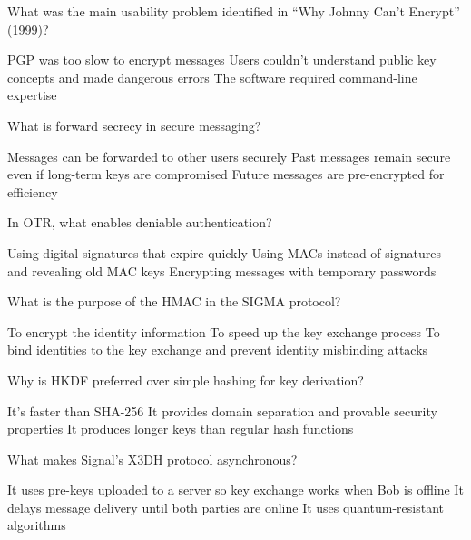\documentclass[10pt,a4paper,american]{exam}
\begin{document}
\begin{questions}
	\question What was the main usability problem identified in ``Why Johnny Can't Encrypt'' (1999)?
	\begin{randomizechoices}
		\choice PGP was too slow to encrypt messages
		\CorrectChoice Users couldn't understand public key concepts and made dangerous errors
		\choice The software required command-line expertise
	\end{randomizechoices}

	\question What is forward secrecy in secure messaging?
	\begin{randomizechoices}
		\choice Messages can be forwarded to other users securely
		\CorrectChoice Past messages remain secure even if long-term keys are compromised
		\choice Future messages are pre-encrypted for efficiency
	\end{randomizechoices}

	\question In OTR, what enables deniable authentication?
	\begin{randomizechoices}
		\choice Using digital signatures that expire quickly
		\CorrectChoice Using MACs instead of signatures and revealing old MAC keys
		\choice Encrypting messages with temporary passwords
	\end{randomizechoices}

	\question What is the purpose of the HMAC in the SIGMA protocol?
	\begin{randomizechoices}
		\choice To encrypt the identity information
		\choice To speed up the key exchange process
		\CorrectChoice To bind identities to the key exchange and prevent identity misbinding attacks
	\end{randomizechoices}

	\question Why is HKDF preferred over simple hashing for key derivation?
	\begin{randomizechoices}
		\choice It's faster than SHA-256
		\CorrectChoice It provides domain separation and provable security properties
		\choice It produces longer keys than regular hash functions
	\end{randomizechoices}

	\question What makes Signal's X3DH protocol asynchronous?
	\begin{randomizechoices}
		\CorrectChoice It uses pre-keys uploaded to a server so key exchange works when Bob is offline
		\choice It delays message delivery until both parties are online
		\choice It uses quantum-resistant algorithms
	\end{randomizechoices}


\end{questions}
\end{document}
